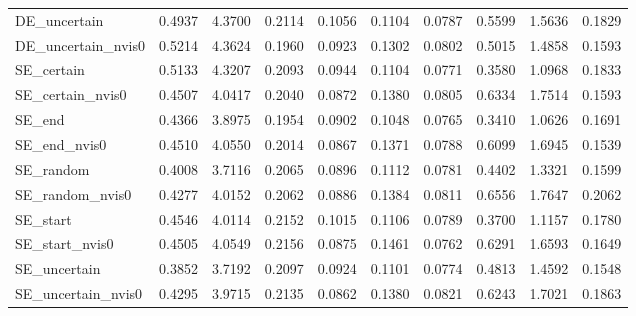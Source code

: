 \begin{tabular}{lrrrrrrrrr}
DE_uncertain & 0.4937 & 4.3700 & 0.2114 & 0.1056 & 0.1104 & 0.0787 & 0.5599 & 1.5636 & 0.1829 \\
DE_uncertain_nvis0 & 0.5214 & 4.3624 & 0.1960 & 0.0923 & 0.1302 & 0.0802 & 0.5015 & 1.4858 & 0.1593 \\
SE_certain & 0.5133 & 4.3207 & 0.2093 & 0.0944 & 0.1104 & 0.0771 & 0.3580 & 1.0968 & 0.1833 \\
SE_certain_nvis0 & 0.4507 & 4.0417 & 0.2040 & 0.0872 & 0.1380 & 0.0805 & 0.6334 & 1.7514 & 0.1593 \\
SE_end & 0.4366 & 3.8975 & 0.1954 & 0.0902 & 0.1048 & 0.0765 & 0.3410 & 1.0626 & 0.1691 \\
SE_end_nvis0 & 0.4510 & 4.0550 & 0.2014 & 0.0867 & 0.1371 & 0.0788 & 0.6099 & 1.6945 & 0.1539 \\
SE_random & 0.4008 & 3.7116 & 0.2065 & 0.0896 & 0.1112 & 0.0781 & 0.4402 & 1.3321 & 0.1599 \\
SE_random_nvis0 & 0.4277 & 4.0152 & 0.2062 & 0.0886 & 0.1384 & 0.0811 & 0.6556 & 1.7647 & 0.2062 \\
SE_start & 0.4546 & 4.0114 & 0.2152 & 0.1015 & 0.1106 & 0.0789 & 0.3700 & 1.1157 & 0.1780 \\
SE_start_nvis0 & 0.4505 & 4.0549 & 0.2156 & 0.0875 & 0.1461 & 0.0762 & 0.6291 & 1.6593 & 0.1649 \\
SE_uncertain & 0.3852 & 3.7192 & 0.2097 & 0.0924 & 0.1101 & 0.0774 & 0.4813 & 1.4592 & 0.1548 \\
SE_uncertain_nvis0 & 0.4295 & 3.9715 & 0.2135 & 0.0862 & 0.1380 & 0.0821 & 0.6243 & 1.7021 & 0.1863 \\
\bottomrule
\end{tabular}
